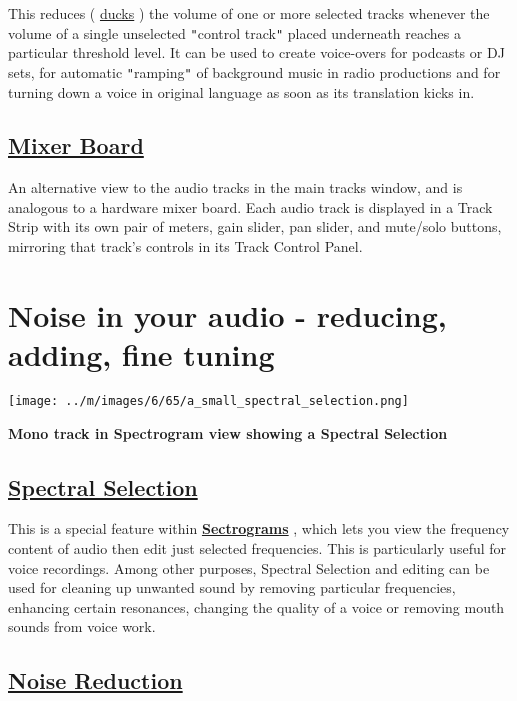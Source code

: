 \documentclass[]{book}
\begin{document}
\begin{multicols}{2}
This reduces (
\hyperref[https:__en.wikipedia.org_wiki_Ducking]{ducks}
) the volume of one or more selected tracks whenever the volume of a single unselected \texttt{{}"{}}control track\texttt{{}"{}} placed underneath reaches a particular threshold level. It can be used to create voice-overs for podcasts or DJ sets, for automatic \texttt{{}"{}}ramping\texttt{{}"{}} of background music in radio productions and for turning down a voice in original language as soon as its translation kicks in.

\subsection{
\hyperref[mixer_board_]{Mixer Board}
}


An alternative view to the audio tracks in the main tracks window, and is analogous to a hardware mixer board. Each audio track is displayed in a Track Strip with its own pair of meters, gain slider, pan slider, and mute/solo buttons, mirroring that track's controls in its Track Control Panel. 



\section{Noise in your audio - reducing, adding, fine tuning}

\par\texttt{[image: ../m/images/6/65/a\_small\_spectral\_selection.png]}\par\textbf{Mono track in Spectrogram view showing a Spectral Selection}

\subsection{
\hyperref[spectral_selection_]{Spectral Selection}
}


This is a special feature within \textbf{
\hyperref[spectrogram_view_]{Sectrograms}
}, which lets you view the frequency content of audio then edit just selected frequencies.  This is particularly useful for voice recordings.  Among other purposes, Spectral Selection and editing can be used for cleaning up unwanted sound by removing particular frequencies, enhancing certain resonances, changing the quality of a voice or removing mouth sounds from voice work.

\subsection{
\hyperref[noise_reduction_]{Noise Reduction}
}



\end{multicols}
\end{document}
